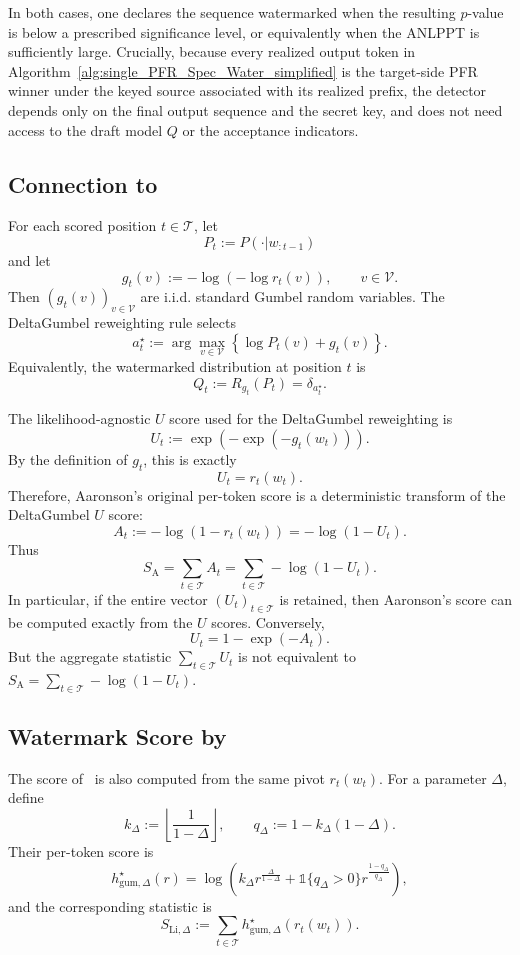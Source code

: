\documentclass{article}
\theoremstyle{plain}
\theoremstyle{definition}
\begin{document}
In both cases, one declares the sequence watermarked when the resulting $p$-value is below a prescribed significance level, or equivalently when the ANLPPT is sufficiently large. 
Crucially, because every realized output token in Algorithm~\ref{alg:single_PFR_Spec_Water_simplified} is the target-side PFR winner under the keyed source associated with its realized prefix, the detector depends only on the final output sequence and the secret key, and does not need access to the draft model $Q$ or the acceptance indicators.



\subsection{Connection to \citep{hu2024inevitable}}
\label{subapp::aaronson_inevitable_discuss}


For each scored position $t\in\mathcal{T}$, let
\[
P_t:=P(\cdot|w_{:t-1})
\]
and let
\[
g_t(v):=-\log(-\log r_t(v)), \qquad v\in\mathcal{V}.
\]
Then $(g_t(v))_{v\in\mathcal{V}}$ are i.i.d. standard Gumbel random variables.
The DeltaGumbel reweighting rule selects
\[
a_t^\star
:=
\arg\max_{v\in\mathcal{V}}
\left\{\log P_t(v)+g_t(v)\right\}.
\]
Equivalently, the watermarked distribution at position $t$ is
\[
Q_t:=R_{g_t}(P_t)=\delta_{a_t^\star}.
\]

The likelihood-agnostic $U$ score used for the DeltaGumbel reweighting is
\[
U_t
:=
\exp(-\exp(-g_t(w_t))).
\]
By the definition of $g_t$, this is exactly
\[
U_t=r_t(w_t).
\]
Therefore, Aaronson's original per-token score is a deterministic transform of the
DeltaGumbel $U$ score:
\[
A_t
:=
-\log(1-r_t(w_t))
=
-\log(1-U_t).
\]
Thus
\[
S_{\mathrm{A}}
=
\sum_{t\in\mathcal{T}} A_t
=
\sum_{t\in\mathcal{T}} -\log(1-U_t).
\]
In particular, if the entire vector $(U_t)_{t\in\mathcal{T}}$ is retained, then Aaronson's score can be
computed exactly from the $U$ scores. Conversely,
\[
U_t=1-\exp(-A_t).
\]
But the aggregate statistic $\sum_{t\in\mathcal{T}} U_t$ is not equivalent to $S_{\mathrm{A}}=\sum_{t\in\mathcal{T}}-\log(1-U_t)$. 





\subsection{Watermark Score by~\citep{li2025statistical}} 


The score of~\citet{li2025statistical} is also computed from the same pivot
$r_t(w_t)$. For a parameter $\Delta$, define
\[
k_\Delta:=\left\lfloor\frac{1}{1-\Delta}\right\rfloor,
\qquad
q_\Delta:=1-k_\Delta(1-\Delta).
\]
Their per-token score is
\[
h^\star_{\mathrm{gum},\Delta}(r)
=
\log\left(
k_\Delta r^{\frac{\Delta}{1-\Delta}}
+
\mathds{1}\{q_\Delta>0\}
r^{\frac{1-q_\Delta}{q_\Delta}}
\right),
\]
and the corresponding statistic is
\[
S_{\mathrm{Li},\Delta}
:=
\sum_{t\in\mathcal{T}}
h^\star_{\mathrm{gum},\Delta}(r_t(w_t)).
\]
\end{document}
